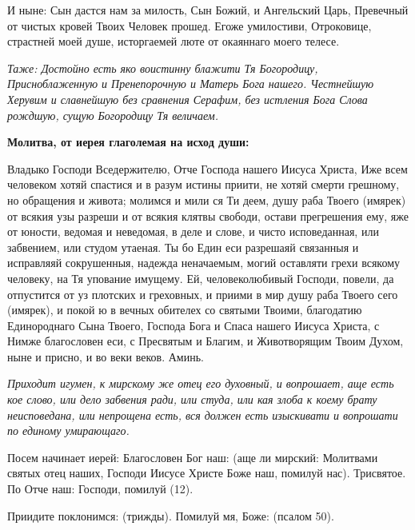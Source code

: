 И ныне: Сын дастся нам за милость, Сын Божий, и Ангельский Царь, Превечный от чистых кровей Твоих Человек прошед. Егоже умилостиви, Отроковице, страстней моей душе, исторгаемей люте от окаяннаго моего телесе. 

\itshape Таже\normalfont{}: Достойно есть яко воистинну блажити Тя Богородицу, Присноблаженную и Пренепорочную и Матерь Бога нашего. Честнейшую Херувим и славнейшую без сравнения Серафим, без истления Бога Слова рождшую, сущую Богородицу Тя величаем.


\medskip


\bfseries Молитва, от иерея глаголемая на исход души:\normalfont{}


Владыко Господи Вседержителю, Отче Господа нашего Иисуса Христа, Иже всем человеком хотяй спастися и в разум истины приити, не хотяй смерти грешному, но обращения и живота; молимся и мили ся Ти деем, душу раба Твоего (имярек) от всякия узы разреши и от всякия клятвы свободи, остави прегрешения ему, яже от юности, ведомая и неведомая, в деле и слове, и чисто исповеданная, или забвением, или студом утаеная. Ты бо Един еси разрешаяй связанныя и исправляяй сокрушенныя, надежда неначаемым, могий оставляти грехи всякому человеку, на Тя упование имущему. Ей, человеколюбивый Господи, повели, да отпустится от уз плотских и греховных, и приими в мир душу раба Твоего сего (имярек), и покой ю в вечных обителех со святыми Твоими, благодатию Единороднаго Сына Твоего, Господа Бога и Спаса нашего Иисуса Христа, с Нимже благословен еси, с Пресвятым и Благим, и Животворящим Твоим Духом, ныне и присно, и во веки веков. Аминь.


\mychapterending

 


\itshape Приходит игумен, к мирскому же отец его духовный, и вопрошает, аще есть кое слово, или дело забвения ради, или студа, или кая злоба к коему брату неисповедана, или непрощена есть, вся должен есть изыскивати и вопрошати по единому умирающаго.\normalfont{}


Посем начинает иерей: Благословен Бог наш: (аще ли мирский: Молитвами святых отец наших, Господи Иисусе Христе Боже наш, помилуй нас). Трисвятое. По Отче наш: Господи, помилуй (12).


Приидите поклонимся: (трижды). Помилуй мя, Боже: (псалом 50).


